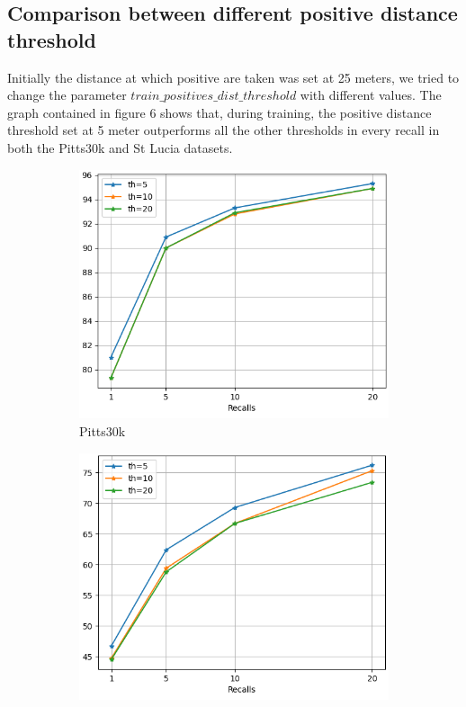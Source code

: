 \documentclass[10pt,twocolumn,letterpaper]{article}
\begin{document}
\subsection{Comparison between different positive distance threshold}
Initially the distance at which positive are taken was set at 25 meters, we tried to change the parameter ${train\_positives\_dist\_threshold}$ with different values. The graph contained in figure 6 shows that, during training, the positive distance threshold set at 5 meter outperforms all the other thresholds in every recall in both the Pitts30k and St Lucia datasets.\\
\begin{figure}[!h]
	\centering
	\begin{subfigure}[b]{0.23\textwidth}
		\centering
		\includegraphics[width=\textwidth]{img/train_th/test_pitts30k_recalls_graph.png}
		\caption{Pitts30k}
		\label{fig:recalls:train_th:pitts30k}
	\end{subfigure}
	\hfill
	\begin{subfigure}[b]{0.23\textwidth}
		\centering
		\includegraphics[width=\textwidth]{img/train_th/test_st_lucia_recalls_graph.png}

\end{subfigure}
\end{figure}
\end{document}
